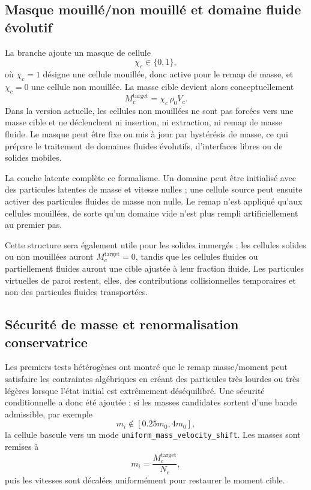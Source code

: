 \documentclass[11pt,a4paper]{article}
\begin{document}
\subsection{Masque mouillé/non mouillé et domaine fluide évolutif}

La branche ajoute un masque de cellule
\begin{equation}
  \chi_c \in \{0,1\},
\end{equation}
où $\chi_c=1$ désigne une cellule mouillée, donc active pour le remap de masse, et $\chi_c=0$ une cellule non mouillée. La masse cible devient alors conceptuellement
\begin{equation}
  M_c^{\mathrm{target}} = \chi_c\,\rho_0 V_c.
\end{equation}
Dans la version actuelle, les cellules non mouillées ne sont pas forcées vers une masse cible et ne déclenchent ni insertion, ni extraction, ni remap de masse fluide. Le masque peut être fixe ou mis à jour par hystérésis de masse, ce qui prépare le traitement de domaines fluides évolutifs, d'interfaces libres ou de solides mobiles.

La couche latente complète ce formalisme. Un domaine peut être initialisé avec des particules latentes de masse et vitesse nulles ; une cellule source peut ensuite activer des particules fluides de masse non nulle. Le remap n'est appliqué qu'aux cellules mouillées, de sorte qu'un domaine vide n'est plus rempli artificiellement au premier pas.

Cette structure sera également utile pour les solides immergés : les cellules solides ou non mouillées auront $M_c^{\mathrm{target}}=0$, tandis que les cellules fluides ou partiellement fluides auront une cible ajustée à leur fraction fluide. Les particules virtuelles de paroi restent, elles, des contributions collisionnelles temporaires et non des particules fluides transportées.

\subsection{Sécurité de masse et renormalisation conservatrice}

Les premiers tests hétérogènes ont montré que le remap masse/moment peut satisfaire les contraintes algébriques en créant des particules très lourdes ou très légères lorsque l'état initial est extrêmement déséquilibré. Une sécurité conditionnelle a donc été ajoutée : si les masses candidates sortent d'une bande admissible, par exemple
\begin{equation}
  m_i \notin [0.25m_0,4m_0],
\end{equation}
la cellule bascule vers un mode \texttt{uniform\_mass\_velocity\_shift}. Les masses sont remises à
\begin{equation}
  m_i = \frac{M_c^{\mathrm{target}}}{N_c},
\end{equation}
puis les vitesses sont décalées uniformément pour restaurer le moment cible.
\end{document}

